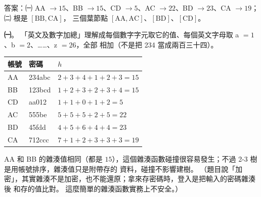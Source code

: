 \begin{pastsoln}
答案：㈠ AA $\to 15$、BB $\to 15$、CD $\to 5$、AC $\to 22$、BD $\to 23$、CA $\to 19$；㈡ 根是 $[\mathrm{BB}, \mathrm{CA}]$，
三個葉節點 $[\mathrm{AA}, \mathrm{AC}]$、$[\mathrm{BD}]$、$[\mathrm{CD}]$。

\textbf{㈠}。 「英文及數字加總」理解成每個數字字元取它的值、每個英文字母取 a $= 1$、b $= 2$、……、z $= 26$，全部
相加（不是把 234 當成兩百三十四）。
\begin{center}
\begin{tabular}{lll}
\toprule
帳號 & 密碼 & $h$ \\
\midrule
AA & 234abc & $2 + 3 + 4 + 1 + 2 + 3 = 15$ \\
BB & 123bcd & $1 + 2 + 3 + 2 + 3 + 4 = 15$ \\
CD & aa012 & $1 + 1 + 0 + 1 + 2 = 5$ \\
AC & 555be & $5 + 5 + 5 + 2 + 5 = 22$ \\
BD & 45fdd & $4 + 5 + 6 + 4 + 4 = 23$ \\
CA & 712ccc & $7 + 1 + 2 + 3 + 3 + 3 = 19$ \\
\bottomrule
\end{tabular}
\end{center}
AA 和 BB 的雜湊值相同（都是 $15$），這個雜湊函數碰撞很容易發生；不過 2-3 樹是用帳號排序，雜湊值只是附帶存的
資料，碰撞不影響建樹。 （題目說「加密」，其實雜湊不是加密，也不能還原；拿來存密碼時，登入是把輸入的密碼雜湊後
和存的值比對。 這麼簡單的雜湊函數實務上不安全。）


\end{pastsoln}
